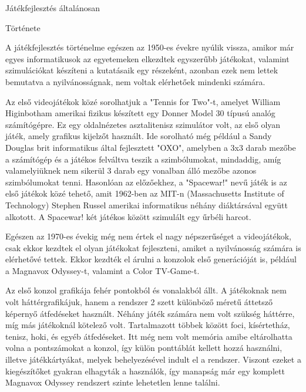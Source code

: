 \begin{MyChapter}{Játékfejlesztés általánosan}

	\begin{MySection}{Története}
		
		A játékfejlesztés történelme egészen az 1950-es évekre nyúlik vissza, amikor már egyes informatikusok az egyetemeken elkezdtek egyszerűbb játékokat, valamint szimulációkat készíteni a kutatásaik egy részeként, azonban ezek nem lettek bemutatva a nyilvánosságnak, nem voltak elérhetőek mindenki számára.
		
		Az első videojátékok közé sorolhatjuk a "Tennis for Two"-t, amelyet William Higinbotham amerikai fizikus készített egy Donner Model 30 típusú analóg számítógépre. Ez egy oldalnézetes asztalitenisz szimulátor volt, az első olyan játék, amely grafikus kijelzőt használt.
		Ide sorolható még például a Sandy Douglas brit informatikus által fejlesztett "OXO", amelyben a 3x3 darab mezőbe a számítógép és a játékos felváltva teszik a szimbólumokat, mindaddig, amíg valamelyiüknek nem sikerül 3 darab egy vonalban álló mezőbe azonos szimbólumokat tenni.
		Hasonlóan az előzőekhez, a "Spacewar!" nevű játék is az első játékok közé tehető, amit 1962-ben az MIT-n (Massachusetts Institute of Technology) Stephen Russel amerikai informatikus néhány diáktársával együtt alkotott. A Spacewar! két játékos között szimulált egy űrbéli harcot.
		
		
		Egészen az 1970-es évekig még nem értek el nagy népszerűséget a videojátékok, csak ekkor kezdtek el olyan játékokat fejleszteni, amiket a nyilvánosság számára is elérhetővé tettek. Ekkor kezdték el árulni a konzolok első generációját is, például a Magnavox Odyssey-t, valamint a Color TV-Game-t.
		
		Az első konzol grafikája fehér pontokból és vonalakból állt. A játékoknak nem volt háttérgrafikájuk, hanem a rendszer 2 szett különböző méretű áttetsző képernyő átfedéseket használt. Néhány játék számára nem volt szükség háttérre, míg más játékoknál kötelező volt. Tartalmazott többek között foci, kísértetház, tenisz, hoki, és egyéb átfedéseket. Itt még nem volt memória amibe eltárolhatta volna a pontszámokat a konzol, így külön ponttáblát kellett hozzá használni, illetve játékkártyákat, melyek behelyezésével indult el a rendszer. Viszont ezeket a kiegészítőket gyakran elhagyták a használók, így manapság már egy komplett Magnavox Odyssey rendszert szinte lehetetlen lenne találni.
		

\end{MySection}
\end{MyChapter}
